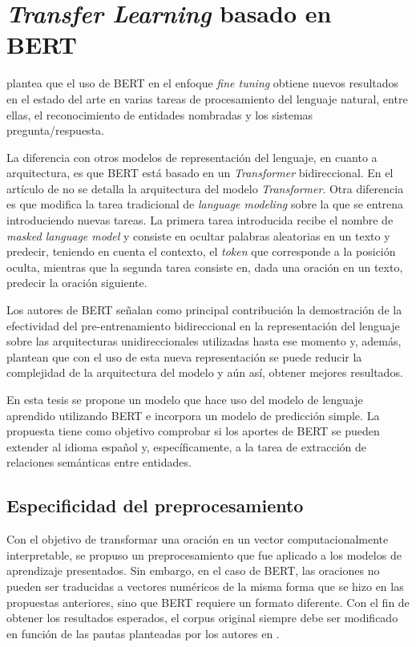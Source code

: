 \section{\textit{Transfer Learning} basado en BERT}\label{bert_t}

\cite{2018-devlin-bert} plantea que el uso de BERT en el enfoque \textit{fine tuning} obtiene nuevos resultados en el estado del arte en varias tareas de procesamiento del lenguaje natural, entre ellas, el reconocimiento de entidades nombradas y los sistemas pregunta/respuesta.

La diferencia con otros modelos de representación del lenguaje, en cuanto a arquitectura, es que BERT está basado en un \textit{Transformer} bidireccional. En el artículo de \cite{2018-devlin-bert} no se detalla la arquitectura del modelo \textit{Transformer}. Otra diferencia es que modifica la tarea tradicional de \textit{language modeling} sobre la que se entrena introduciendo nuevas tareas. La primera tarea introducida recibe el nombre de \textit{masked language model} y consiste en ocultar palabras aleatorias en un texto y predecir, teniendo en cuenta el contexto, el \textit{token} que corresponde a la posición oculta, mientras que la segunda tarea consiste en, dada una oración en un texto, predecir la oración siguiente.

Los autores de BERT señalan como principal contribución la demostración de la efectividad del pre-entrenamiento bidireccional en la representación del lenguaje sobre las arquitecturas unidireccionales utilizadas hasta ese momento y, además, plantean que con el uso de esta nueva representación se puede reducir la complejidad de la arquitectura del modelo y aún así, obtener mejores resultados.

En esta tesis se propone un modelo que hace uso del modelo de lenguaje aprendido utilizando BERT e incorpora un modelo de predicción simple. La propuesta tiene como objetivo comprobar si los aportes de BERT se pueden extender al idioma español y, específicamente, a la tarea de extracción de relaciones semánticas entre entidades.

\subsection{Especificidad del preprocesamiento}

Con el objetivo de transformar una oración en un vector computacionalmente interpretable, se propuso un preprocesamiento que fue aplicado a los modelos de aprendizaje presentados. Sin embargo, en el caso de BERT, las oraciones no pueden ser traducidas a vectores numéricos de la misma forma que se hizo en las propuestas anteriores, sino que BERT requiere un formato diferente. Con el fin de obtener los resultados esperados, el corpus original siempre debe ser modificado en función de las pautas planteadas por los autores en \cite{2018-devlin-bert}.

